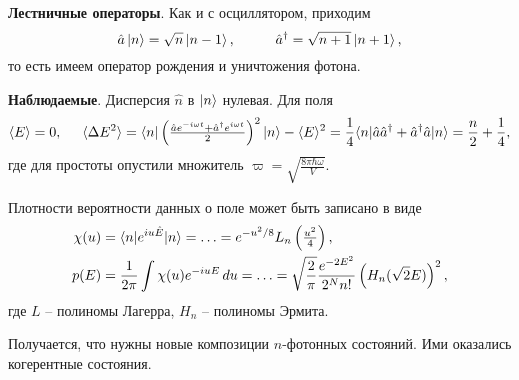 \textbf{Лестничные операторы}. Как и с осциллятором, приходим
\begin{equation*}
    \hat{a} \ket{n} = \sqrt{n} \ket{n-1},
    \hspace{10 mm} 
    \hat{a}\D = \sqrt{n+1} \ket{n+1},
\end{equation*}
то есть имеем оператор рождения и уничтожения фотона.



\textbf{Наблюдаемые}. Дисперсия $\hat{n}$ в $\left| n \right\rangle$ нулевая. Для поля
\begin{equation*}
    \langle E\rangle = 0,
    \hspace{5 mm} 
    \langle \Delta E^2\rangle = \bk{n}[\left(
        \tfrac{\hat{a} e^{- i \omega t} + \hat{a}\D e^{i \omega t}}{2}
    \right)^2]{n} - \langle E\rangle^2 = \frac{1}{4} \bk{n}[\hat{a} \hat{a}\D + \hat{a}\D \hat{a}]{n} = \frac{n}{2} + \frac{1}{4},
\end{equation*}
где для простоты опустили множитель $\varpi = \sqrt{\frac{8 \pi \hbar \omega}{V}}$.



Плотности вероятности данных о поле может быть записано в виде
\begin{align*}
    \chi(u) &= \bk{n}[e^{i u \hat{E}}]{n} = \ldots = e^{-u^2/8} L_n \left(\tfrac{u^2}{4}\right), \\
    p(E) &= \frac{1}{2\pi} \int \chi(u) e^{- i u E} \d u = \ldots = \sqrt{\frac{2}{\pi}} \frac{e^{-2 E^2}}{2^N n!} \left(
        H_n(\sqrt{2} E)
    \right)^2,
\end{align*}
где $L$ -- полиномы Лагерра, $H_n$ -- полиномы Эрмита.



Получается, что нужны новые композиции $n$-фотонных состояний. Ими оказались когерентные состояния. 




